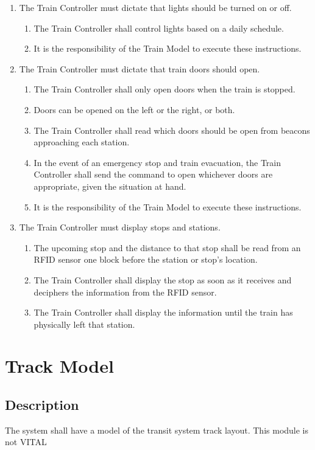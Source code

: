 \documentclass{scrreprt}
\begin{document}
\begin{enumerate}
\item The Train Controller must dictate that lights should be turned on or off.
	\begin{enumerate}
		\item The Train Controller shall control lights based on a daily schedule.
		\item It is the responsibility of the Train Model to execute these instructions.
	\end{enumerate}

\item The Train Controller must dictate that train doors should open.
	\begin{enumerate}
		\item The Train Controller shall only open doors when the train is stopped.
		\item Doors can be opened on the left or the right, or both.
		\item The Train Controller shall read which doors should be open from beacons approaching each station.
		\item In the event of an emergency stop and train evacuation, the Train Controller shall send the command to open whichever doors are appropriate, given the situation at hand.
		\item It is the responsibility of the Train Model to execute these instructions.
	\end{enumerate}

\item The Train Controller must display stops and stations.
	\begin{enumerate}
		\item The upcoming stop and the distance to that stop shall be read from an RFID sensor one block before the station or stop's location.
		\item The Train Controller shall display the stop as soon as it receives and deciphers the information from the RFID sensor.
		\item The Train Controller shall display the information until the train has physically left that station.
	\end{enumerate}
\end{enumerate}

\section{Track Model}

\subsection{Description}
The system shall have a model of the transit system track layout. This module is not VITAL
\end{document}

